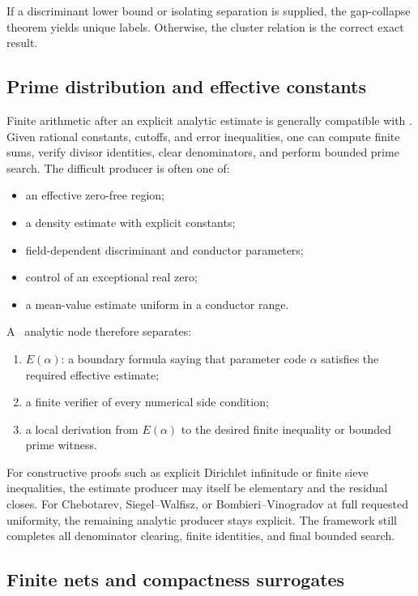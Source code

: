 If a discriminant lower bound or isolating separation is supplied, the gap-collapse theorem yields unique labels.  Otherwise, the cluster relation is the correct exact result.

\subsection{Prime distribution and effective constants}

Finite arithmetic after an explicit analytic estimate is generally compatible with \iPRA.  Given rational constants, cutoffs, and error inequalities, one can compute finite sums, verify divisor identities, clear denominators, and perform bounded prime search.  The difficult producer is often one of:

\begin{itemize}
\item an effective zero-free region;
\item a density estimate with explicit constants;
\item field-dependent discriminant and conductor parameters;
\item control of an exceptional real zero;
\item a mean-value estimate uniform in a conductor range.
\end{itemize}

A \CIFER\ analytic node therefore separates:
\begin{enumerate}
\item \(E(\alpha)\): a boundary formula saying that parameter code \(\alpha\) satisfies the required effective estimate;
\item a finite verifier of every numerical side condition;
\item a local derivation from \(E(\alpha)\) to the desired finite inequality or bounded prime witness.
\end{enumerate}

For constructive proofs such as explicit Dirichlet infinitude or finite sieve inequalities, the estimate producer may itself be elementary and the residual closes.  For Chebotarev, Siegel--Walfisz, or Bombieri--Vinogradov at full requested uniformity, the remaining analytic producer stays explicit.  The framework still completes all denominator clearing, finite identities, and final bounded search.

\subsection{Finite nets and compactness surrogates}

